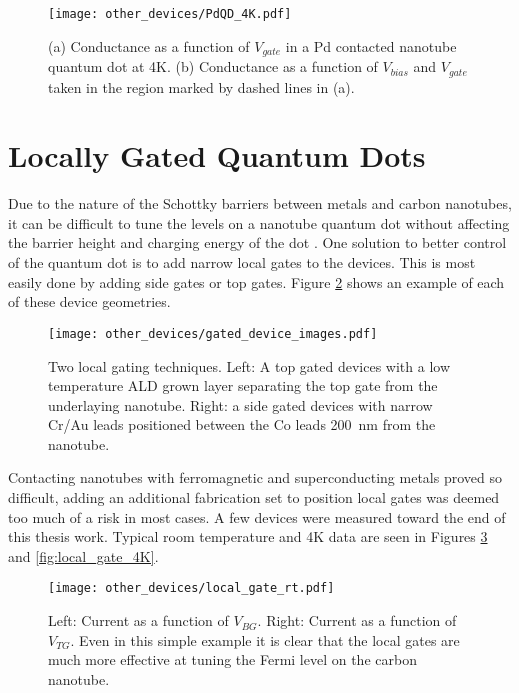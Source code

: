 \begin{figure}
    \centering
    \texttt{[image: other\_devices/PdQD\_4K.pdf]}
    \caption{(a) Conductance as a function of $V_{gate}$ in a Pd contacted nanotube quantum dot at 4K. (b) Conductance as a function of $V_{bias}$ and $V_{gate}$ taken in the region marked by dashed lines in (a).}
    \label{fig:PdQD_4K}
\end{figure}

\section{Locally Gated Quantum Dots}

Due to the nature of the Schottky barriers between metals and carbon nanotubes, it can be difficult to tune the levels on a nanotube quantum dot without affecting the barrier height and charging energy of the dot \cite{Schottky1938, Svensson2011}. One solution to better control of the quantum dot is to add narrow local gates to the devices. This is most easily done by adding side gates or top gates. Figure \ref{fig:local_gating} shows an example of each of these device geometries.

\begin{figure}
    \centering
    \texttt{[image: other\_devices/gated\_device\_images.pdf]}
    \caption{Two local gating techniques. Left: A top gated devices with a low temperature ALD grown  layer separating the top gate from the underlaying nanotube. Right: a side gated devices with narrow Cr/Au leads positioned between the Co leads \SI{200}{\nano\meter} from the nanotube.}
    \label{fig:local_gating}
\end{figure}

Contacting nanotubes with ferromagnetic and superconducting metals proved so difficult, adding an additional fabrication set to position local gates was deemed too much of a risk in most cases. A few devices were measured toward the end of this thesis work. Typical room temperature and 4K data are seen in Figures \ref{fig:local_gate_rt} and \ref{fig:local_gate_4K}.

\begin{figure}
    \centering
    \texttt{[image: other\_devices/local\_gate\_rt.pdf]}
    \caption{Left: Current as a function of $V_{BG}$. Right: Current as a function of $V_{TG}$. Even in this simple example it is clear that the local gates are much more effective at tuning the Fermi level on the carbon nanotube.}
    \label{fig:local_gate_rt}
\end{figure}

